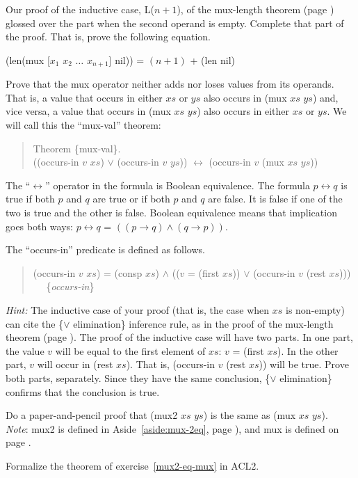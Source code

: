 \begin{ExerciseList}
\Exercise
Our proof of the inductive case, L($n+1$), of the mux-length theorem
(page \pageref{mux-length-thm-induc-case})
glossed over the part when the second operand is empty.
Complete that part of the proof. That is, prove the following equation.

\hspace{1cm} (len(mux [$x_1$ $x_2$ $\dots$ $x_{n+1}$] nil)) = $(n+1)$ + (len nil)

\Exercise [label={ex:mul-val-thm}]
Prove that the mux operator neither adds nor loses values from its operands.
That is, a value that occurs in either $xs$ or $ys$ also occurs in (mux $xs$ $ys$)
and, vice versa, a value that occurs in (mux $xs$ $ys$) also occurs in either $xs$ or $ys$.
We will call this the ``mux-val'' theorem:

\begin{quote}
\label{thm:mux-val}
Theorem \{mux-val\}.\\
((occurs-in $v$ $xs$) $\vee$ (occurs-in $v$ $ys$)) $\leftrightarrow$ (occurs-in $v$ (mux $xs$ $ys$))
\end{quote}

\label{def:equivalence-op}
The ``$\leftrightarrow$'' operator in the formula is Boolean equivalence.
The formula $p \leftrightarrow q$ is true if both $p$ and $q$ are true
or if both $p$ and $q$ are false. It is false if one of the two is true
and the other is false. Boolean equivalence means that implication goes both ways:
$p \leftrightarrow q$ = $((p \rightarrow q) \wedge (q \rightarrow p))$.

The ``occurs-in'' predicate is defined as follows.
\begin{quote}
\label{def:occurs-in}
(occurs-in $v$ $xs$) = (consp $xs$) $\wedge$ (($v$ = (first $xs$)) $\vee$ (occurs-in $v$ (rest $xs$))) ~~ \{\emph{occurs-in}\}
\end{quote}

\emph{Hint:} The inductive case of your proof
(that is, the case when $xs$ is non-empty)
can cite the \{$\vee$ elimination\} inference rule,
as in the proof of the mux-length theorem (page \pageref{mux-length-thm}).
The proof of the inductive case will have two parts.
In one part, the value $v$ will be equal to
the first element of $xs$:
$v$ = (first $xs$).
In the other part, $v$ will occur in (rest $xs$).
That is, (occurs-in $v$ (rest $xs$)) will be true.
Prove both parts, separately.
Since they have the same conclusion,
\{$\vee$ elimination\} confirms that the conclusion is true.

\Exercise
\label{mux2-eq-mux}
Do a paper-and-pencil proof that
(mux2 $xs$ $ys$) is the same as (mux $xs$ $ys$).\\
\emph{Note}: mux2 is defined in 
Aside~\ref{aside:mux-2eq}, page \pageref{aside:mux-2eq}),
and mux is defined on page \pageref{mux-defun}.

\Exercise
Formalize the theorem of exercise~\ref{mux2-eq-mux} in ACL2.

\end{ExerciseList}

